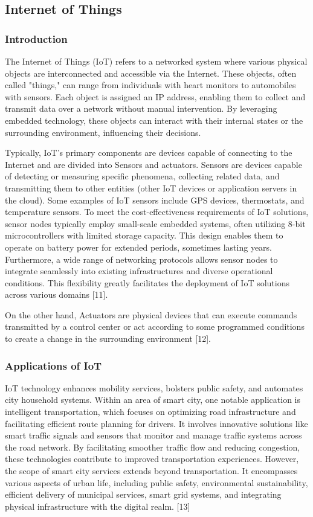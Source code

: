 \subsection{Internet of Things}
\subsubsection{Introduction}
The Internet of Things (IoT) refers to a networked system where various physical objects are interconnected and accessible via the Internet. These objects, often called "things," can range from individuals with heart monitors to automobiles with sensors. 
Each object is assigned an IP address, enabling them to collect and transmit data over a network without manual intervention. By leveraging embedded technology, these objects can interact with their internal states or the surrounding environment, influencing their decisions. 

Typically, IoT's primary components are devices capable of connecting to the Internet and are divided into Sensors and actuators. Sensors are devices capable of detecting or measuring specific phenomena, collecting related data, and transmitting them to other entities (other IoT devices or application servers in the cloud). 
Some examples of IoT sensors include GPS devices, thermostats, and temperature sensors. To meet the cost-effectiveness requirements of IoT solutions, sensor nodes typically employ small-scale embedded systems, often utilizing 8-bit microcontrollers with limited storage capacity.
This design enables them to operate on battery power for extended periods, sometimes lasting years. Furthermore, a wide range of networking protocols allows sensor nodes to integrate seamlessly into existing infrastructures and diverse operational conditions. This flexibility greatly facilitates the deployment of IoT solutions across various domains [11].

On the other hand, Actuators are physical devices that can execute commands transmitted by a control center or act according to some programmed conditions to create a change in the surrounding environment [12].


\subsubsection{Applications of IoT}
IoT technology enhances mobility services, bolsters public safety, and automates city household systems. Within an area of smart city, one notable application is intelligent transportation, which focuses on optimizing road infrastructure and facilitating efficient route planning for drivers. 
It involves innovative solutions like smart traffic signals and sensors that monitor and manage traffic systems across the road network. By facilitating smoother traffic flow and reducing congestion, these technologies contribute to improved transportation experiences. 
However, the scope of smart city services extends beyond transportation. It encompasses various aspects of urban life, including public safety, environmental sustainability, efficient delivery of municipal services, smart grid systems, and integrating physical infrastructure with the digital realm. [13]

